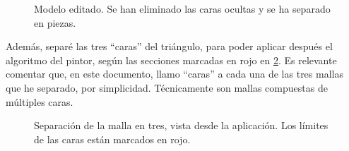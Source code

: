 \documentclass[a4paper,12pt]{article}
\begin{document}
\begin{figure}
    \centering
    \caption{Modelo editado. Se han eliminado las caras ocultas y se ha separado en piezas.} \label{caras_ocultas_borradas}
\end{figure}

Además, separé las tres ``caras'' del triángulo, para poder aplicar después el algoritmo del pintor, según las secciones marcadas en rojo en \ref{separacion_caras_triangulo}. Es relevante comentar que, en este documento, llamo ``caras'' a cada una de las tres mallas que he separado, por simplicidad. Técnicamente son mallas compuestas de múltiples caras.

\begin{figure}
    \centering
    \caption{Separación de la malla en tres, vista desde la aplicación. Los límites de las caras están marcados en rojo.} \label{separacion_caras_triangulo}
\end{figure}
\end{document}

